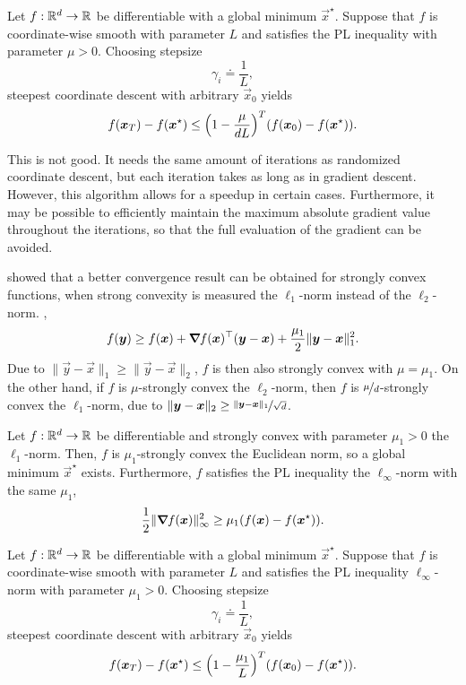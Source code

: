 \begin{theorem}
    Let $f: \R^d \to \R$ be differentiable with a global minimum $\vec{x}^\star$. Suppose that $f$ is coordinate-wise smooth with parameter $L$ and satisfies the PL inequality with parameter $\mu > 0$. Choosing stepsize \[
        \gamma_i \doteq \frac{1}{L},
    \]
    steepest coordinate descent with arbitrary $\vec{x}_0$ yields \[
        f(\vec{x}_T) - f(\vec{x}^\star) \leq \lft( 1 - \frac{\mu}{dL} \rgt)^T (f(\vec{x}_0) - f(\vec{x}^\star)).
    \]
\end{theorem}

This is not good. It needs the same amount of iterations as randomized coordinate descent, but each
iteration takes as long as in gradient descent. However, this algorithm allows for a
speedup in certain cases. Furthermore, it may be possible to efficiently maintain the maximum
absolute gradient value throughout the iterations, so that the full evaluation of the gradient can
be avoided.

\cite{nutini2015coordinate} showed that a better convergence result can be obtained for strongly
convex functions, when strong convexity is measured \wrt the $\ell_1$-norm instead of the
$\ell_2$-norm. \Ie, \[
    f(\vec{y}) \geq f(\vec{x}) + \transpose{\grad{f(\vec{x})}{}} (\vec{y}-\vec{x}) + \frac{\mu_1}{2} \|\vec{y} - \vec{x}\|_1^2.
\]
Due to $\| \vec{y} - \vec{x} \|_1 \geq \| \vec{y} - \vec{x} \|_2$, $f$ is then also strongly convex
with $\mu = \mu_1$. On the other hand, if $f$ is $\mu$-strongly convex \wrt the $\ell_2$-norm, then
$f$ is $\nicefrac{\mu}{d}$-strongly convex \wrt the $\ell_1$-norm, due to $\|\vec{y}-\vec{x}\|_2
    \geq \nicefrac{\|\vec{y}-\vec{x}\|_1}{\sqrt{d}}$.

\begin{lemma}
    Let $f: \R^d \to \R$ be differentiable and strongly convex with parameter $\mu_1 > 0$ \wrt the
    $\ell_1$-norm. Then, $f$ is $\mu_1$-strongly convex \wrt the Euclidean norm, so a global minimum
    $\vec{x}^\star$ exists. Furthermore, $f$ satisfies the PL inequality \wrt the $\ell_{\infty}$-norm with the same $\mu_1$, \[
        \frac{1}{2} \| \grad{f(\vec{x})}{} \|_{\infty}^2 \geq \mu_1 (f(\vec{x}) - f(\vec{x}^\star)).
    \]
\end{lemma}

\begin{theorem}
    Let $f: \R^d \to \R$ be differentiable with a global minimum $\vec{x}^\star$. Suppose that $f$ is
    coordinate-wise smooth with parameter $L$ and satisfies the PL inequality \wrt $\ell_{\infty}$-norm
    with parameter $\mu_1 > 0$. Choosing stepsize \[
        \gamma_i \doteq \frac{1}{L},
    \]
    steepest coordinate descent with arbitrary $\vec{x}_0$ yields \[
        f(\vec{x}_T) - f(\vec{x}^\star) \leq \lft( 1 - \frac{\mu_1}{L} \rgt)^T (f(\vec{x}_0) - f(\vec{x}^\star)).
    \]
\end{theorem}

